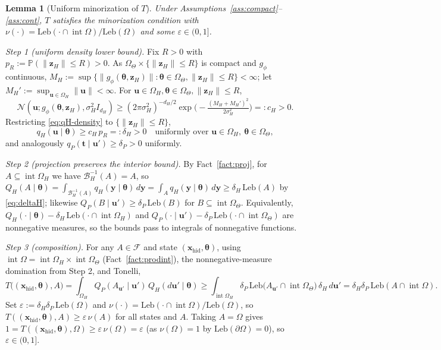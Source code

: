 \documentclass[11pt]{article}
\makeatletter
\theoremstyle{definitionbreak}
\theoremstyle{plainbreak}
\newtheorem{lemma}[theorem]{Lemma}
\theoremstyle{remarkbreak}
\renewenvironment{proof}[1][\proofname]{\par
  \pushQED{\qed}\normalfont
  \topsep6\p@\@plus6\p@\relax
  \trivlist
  \item[\hskip\labelsep\itshape #1\@addpunct{.}]\mbox{}\par\nobreak\ignorespaces
}{\popQED\endtrivlist\@endpefalse}
\newcommand{\Prob}{\mathbb{P}}
\newcommand{\cF}{\mathcal{F}}
\newcommand{\Om}{\Omega}
\newcommand{\Leb}{\mathrm{Leb}}
\newcommand{\Normal}{\mathcal{N}}
\newcommand{\xhid}{\bm{x}_{\mathrm{hid}}}
\newcommand{\bth}{\bm{\theta}}
\DeclareMathOperator{\intr}{int}
\newcommand{\norm}[1]{\lVert #1 \rVert}
\makeatother
\begin{document}
\begin{lemma}[Uniform minorization of $T$]
\label{lem:minor}
Under Assumptions~\ref{ass:compact}--\ref{ass:cont}, $T$ satisfies the minorization condition with
$\nu(\cdot)=\Leb(\cdot\cap\intr\Om)/\Leb(\Om)$ and some $\varepsilon\in(0,1]$.
\end{lemma}
\begin{proof}
\emph{Step 1 (uniform density lower bound).} Fix $R>0$ with $p_R:=\Prob(\norm{\bm z_H}\le R)>0$. As
$\Om_\Theta\times\{\norm{\bm z_H}\le R\}$ is compact and $g_\phi$ continuous,
$M_H:=\sup\{\norm{g_\phi(\bth,\bm z_H)}:\bth\in\Om_\Theta,\norm{\bm z_H}\le R\}<\infty$; let
$M_H':=\sup_{\bm u\in\Om_H}\norm{\bm u}<\infty$. For $\bm u\in\Om_H,\bth\in\Om_\Theta,\norm{\bm z_H}\le R$,
\[
  \Normal(\bm u;g_\phi(\bth,\bm z_H),\sigma_H^2 I_{d_H})
  \ge(2\pi\sigma_H^2)^{-d_H/2}\exp\!\Big(-\tfrac{(M_H+M_H')^2}{2\sigma_H^2}\Big)=:c_H>0 .
\]
Restricting \eqref{eq:qH-density} to $\{\norm{\bm z_H}\le R\}$,
\begin{equation}\label{eq:deltaH}
  q_H(\bm u\mid\bth)\ge c_H\,p_R=:\delta_H>0\quad\text{uniformly over }\bm u\in\Om_H,\ \bth\in\Om_\Theta,
\end{equation}
and analogously $q_P(\bm t\mid\bm u')\ge\delta_P>0$ uniformly.

\emph{Step 2 (projection preserves the interior bound).} By Fact~\ref{fact:proj}, for
$A\subseteq\intr\Om_H$ we have $\mathcal B_H^{-1}(A)=A$, so
$Q_H(A\mid\bth)=\int_{\mathcal B_H^{-1}(A)}q_H(\bm y\mid\bth)\,d\bm y=\int_A q_H(\bm y\mid\bth)\,d\bm y\ge\delta_H\,\Leb(A)$
by \eqref{eq:deltaH}; likewise $Q_P(B\mid\bm u')\ge\delta_P\,\Leb(B)$ for $B\subseteq\intr\Om_\Theta$.
Equivalently, $Q_H(\cdot\mid\bth)-\delta_H\,\Leb(\cdot\cap\intr\Om_H)$ and
$Q_P(\cdot\mid\bm u')-\delta_P\,\Leb(\cdot\cap\intr\Om_\Theta)$ are nonnegative measures, so the
bounds pass to integrals of nonnegative functions.

\emph{Step 3 (composition).} For any $A\in\cF$ and state $(\xhid,\bth)$, using
$\intr\Om=\intr\Om_H\times\intr\Om_\Theta$ (Fact~\ref{fact:prodint}), the nonnegative-measure
domination from Step 2, and Tonelli,
\[
  T\big((\xhid,\bth),A\big)=\int_{\Om_H}Q_P(A_{\bm u'}\mid\bm u')\,Q_H(d\bm u'\mid\bth)
  \ge\int_{\intr\Om_H}\!\!\delta_P\,\Leb\big(A_{\bm u'}\cap\intr\Om_\Theta\big)\,\delta_H\,d\bm u'
  =\delta_H\delta_P\,\Leb(A\cap\intr\Om).
\]
Set $\varepsilon:=\delta_H\delta_P\,\Leb(\Om)$ and $\nu(\cdot)=\Leb(\cdot\cap\intr\Om)/\Leb(\Om)$, so
$T((\xhid,\bth),A)\ge\varepsilon\,\nu(A)$ for all states and $A$. Taking $A=\Om$ gives
$1=T((\xhid,\bth),\Om)\ge\varepsilon\,\nu(\Om)=\varepsilon$ (as $\nu(\Om)=1$ by
$\Leb(\partial\Om)=0$), so $\varepsilon\in(0,1]$.
\end{proof}
\end{document}
